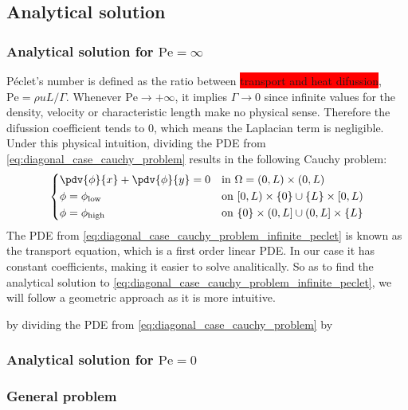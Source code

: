
\subsection{Analytical solution}

\subsubsection{Analytical solution for \texorpdfstring{$\mathrm{Pe} = \infty$}{infinite Péclet's number}}

Péclet's number is defined as the ratio between \colorbox{red}{transport and heat difussion}, $\mathrm{Pe} = \rho u L / \Gamma$. Whenever $\mathrm{Pe} \to +\infty$, it implies $\Gamma \to 0$ since infinite values for the density, velocity or characteristic length make no physical sense. Therefore the difussion coefficient tends to $0$, which means the Laplacian term is negligible. Under this physical intuition, dividing the PDE from \eqref{eq:diagonal_case_cauchy_problem} results in the following Cauchy problem:
\begin{equation} \label{eq:diagonal_case_cauchy_problem_infinite_peclet}
	\left\{
	\begin{aligned}
		&\pdv{\phi}{x} + \pdv{\phi}{y} = 0 &
		&\text{in } \Omega = (0,L) \times (0,L) \\
		&\phi = \phi_\text{low} &
		&\text{on } [0,L) \times \{ 0 \} \cup \{ L \} \times [0,L) \\
		&\phi = \phi_\text{high} &
		&\text{on } \{ 0 \} \times (0,L] \cup (0,L] \times \{ L \}
	\end{aligned}
	\right.
\end{equation}
The PDE from \eqref{eq:diagonal_case_cauchy_problem_infinite_peclet} is known as the transport equation, which is a first order linear PDE. In our case it has constant coefficients, making it easier to solve analitically. So as to find the analytical solution to \eqref{eq:diagonal_case_cauchy_problem_infinite_peclet}, we will follow a geometric approach as it is more intuitive. 

by dividing the PDE from \eqref{eq:diagonal_case_cauchy_problem} by 

\subsubsection{Analytical solution for \texorpdfstring{$\mathrm{Pe} = 0$}{zero Péclet's number}}

\subsubsection{General problem}